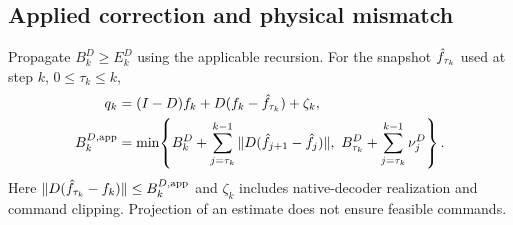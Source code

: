 \subsection{Applied correction and physical mismatch}
Propagate $B_k^D\ge E_k^D$ using the applicable recursion. For the snapshot
$\hat f_{\tau_k}$ used at step $k$, $0\le\tau_k\le k$,
\begin{align}
q_k&=(I-D)f_k+D(f_k-\hat f_{\tau_k})+\zeta_k,
\label{eq:main-mismatch}\\
B_k^{D,\rm app}&=\min\!\left\{
B_k^D+\sum_{j=\tau_k}^{k-1}\|D(\hat f_{j+1}-\hat f_j)\|,
\ B_{\tau_k}^D+\sum_{j=\tau_k}^{k-1}\nu_j^D\right\}.
\label{eq:applied-delay}
\end{align}
Here $\|D(\hat f_{\tau_k}-f_k)\|\le B_k^{D,\rm app}$ and
$\zeta_k$ includes native-decoder realization and command clipping.
Projection of an estimate does not ensure feasible commands.

